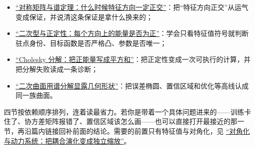 \begin{itemize}
\tightlist
\item \hyperref[sec:03-Linear-Algebra/06-Symmetric-and-Positive-Definite-Matrices/01]{``对称矩阵与谱定理：什么时候特征方向一定正交''}：把``特征方向正交''从运气变成保证，并说清这条保证是拿什么换来的；
\item \hyperref[sec:03-Linear-Algebra/06-Symmetric-and-Positive-Definite-Matrices/02]{``二次型与正定性：每个方向上的能量是否为正''}：学会只看特征值符号就判断驻点身份、目标函数是否严格凸、参数是否唯一；
\item \hyperref[sec:03-Linear-Algebra/06-Symmetric-and-Positive-Definite-Matrices/03]{``Cholesky 分解：把正能量写成平方和''}：把正定性变成一次可执行的计算，并把分解失败读成一条诊断；
\item \hyperref[sec:03-Linear-Algebra/06-Symmetric-and-Positive-Definite-Matrices/04]{``二次曲面用谱分解显露几何形状''}：把误差椭圆、置信区域和优化等高线认成同一族曲面。
\end{itemize}

四节按依赖顺序排列，连着读最省力。若你是带着一个具体问题进来的——训练卡住了、协方差矩阵报错了、置信区域该怎么画——也可以直接打开最接近的那一节，再沿篇内链接回补前面的结论。需要的前置只有特征值与对角化，见 \hyperref[sec:03-Linear-Algebra/05-Eigenvalues-and-Eigenvectors/02]{``对角化与动力系统：把耦合演化变成独立缩放''}。
